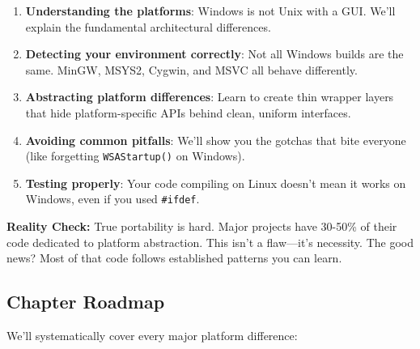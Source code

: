 \begin{enumerate}
    \item \textbf{Understanding the platforms}: Windows is not Unix with a GUI. We'll explain the fundamental architectural differences.

    \item \textbf{Detecting your environment correctly}: Not all Windows builds are the same. MinGW, MSYS2, Cygwin, and MSVC all behave differently.

    \item \textbf{Abstracting platform differences}: Learn to create thin wrapper layers that hide platform-specific APIs behind clean, uniform interfaces.

    \item \textbf{Avoiding common pitfalls}: We'll show you the gotchas that bite everyone (like forgetting \texttt{WSAStartup()} on Windows).

    \item \textbf{Testing properly}: Your code compiling on Linux doesn't mean it works on Windows, even if you used \texttt{\#ifdef}.
\end{enumerate}

\begin{warningbox}
\textbf{Reality Check:} True portability is hard. Major projects have 30-50\% of their code dedicated to platform abstraction. This isn't a flaw---it's necessity. The good news? Most of that code follows established patterns you can learn.
\end{warningbox}

\subsection{Chapter Roadmap}

We'll systematically cover every major platform difference:


